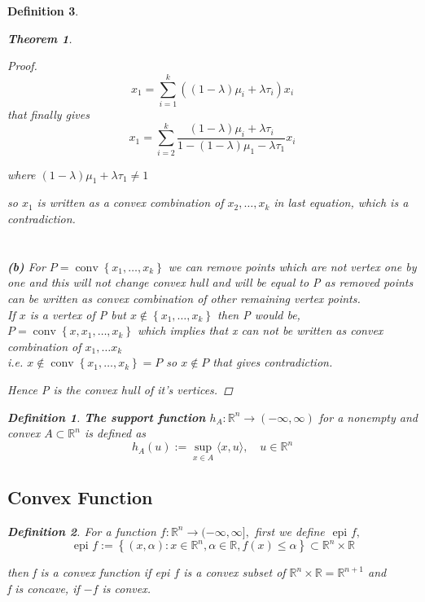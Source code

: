 \documentclass[oneside]{book}
\newtheorem{theorem}{Theorem}[section]
\newtheorem{mydef}{Definition}
\begin{document}
\begin{mydef}
\begin{theorem}
\begin{proof}
\begin{equation} 
\label{eq38}
x_{1}=\sum_{i=1}^{k}\left((1-\lambda) \mu_{i}+\lambda \tau_{i}\right) x_{i}
\end{equation}
that finally gives 
\begin{equation} 
\label{eq39}
x_{1}=\sum_{i=2}^{k} \frac{(1-\lambda) \mu_{i}+\lambda \tau_{i}}{1-(1-\lambda) \mu_{1}-\lambda \tau_{1}} x_{i}
\end{equation}

where $(1-\lambda) \mu_{1}+\lambda \tau_{1} \neq 1$ \par
 so $x_{1}$ is written as a convex combination of $x_{2}, \ldots, x_{k}$ in last equation, which is  a contradiction.
\\\\\\
\textbf{(b)}  For $P=\operatorname{conv}\left\{x_{1}, \ldots, x_{k}\right\}$ we can remove points  which are not vertex  
one by one and this will not change convex hull and will be equal to P as removed points can be written as convex combination of other remaining vertex points. \\
If $x$ is a vertex of P but $x \notin \left\{x_{1}, \ldots, x_{k}\right\} $ then P would be,
$P=\operatorname{conv}\left\{x,x_{1}, \ldots, x_{k}\right\}$ 
which implies that x can not be written as convex combination of $x_{1}, \ldots x_{k}$ \\ i.e. 
 $x \notin  \operatorname{conv} \left\{x_{1}, \ldots, x_{k}\right\} = P  $ so $x \notin P$ that gives contradiction.\par
 Hence P is the convex hull of it's vertices.
\end{proof}


\end{theorem}


\begin{mydef}\label{d:8}
 \textbf{The support function }$h_{A}: \mathbb{R}^{n} \rightarrow(-\infty, \infty) $  for a nonempty and convex $A \subset \mathbb{R}^{n}$ is defined as
$$
h_{A}(u):=\sup _{x \in A}\langle x, u\rangle, \quad u \in \mathbb{R}^{n}
$$

\end{mydef}



\subsection{Convex Function}
\label{ss:17}


\begin{mydef} \label{d:9}
For a function   $f: \mathbb{R}^{n} \rightarrow(-\infty, \infty],$ first we define $\text { epi } f, $  
\begin{equation}
\label{eq40}
\text { epi } f:=\left\{(x, \alpha): x \in \mathbb{R}^{n}, \alpha \in \mathbb{R}, f(x) \leq \alpha\right\} \subset \mathbb{R}^{n} \times \mathbb{R} 
\end{equation}
\end{mydef}
  then f is a convex function if epi $f$ is a convex subset of $\mathbb{R}^{n} \times \mathbb{R}=\mathbb{R}^{n+1}$  and \\  f is concave, if $-f$ is convex. 
  

\end{mydef}
\end{document}
